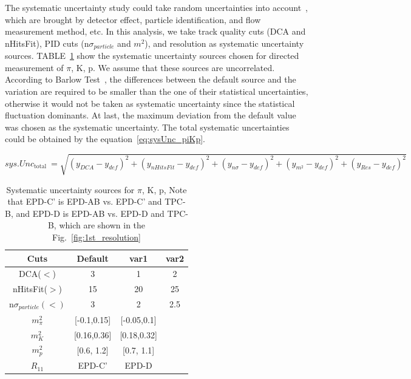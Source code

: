 The systematic uncertainty study could take random uncertainties into account~\cite{barlow2002systematic}, which are brought by detector effect, particle identification, and flow measurement method, etc.
In this analysis, we take track quality cuts (DCA and nHitsFit), PID cuts (n$\sigma_{particle}$ and $m^2$), and resolution as systematic uncertainty sources.
TABLE~\ref{tab:piKp_sysUnc} show the systematic uncertainty sources chosen for directed measurement of $\pi$, K, p.
We assume that these sources are uncorrelated. According to Barlow Test~\cite{barlow2002systematic}, the differences between the default source and the variation are required
to be smaller than the one of their statistical uncertainties, otherwise it would not be taken as systematic uncertainty since the statistical fluctuation dominants.
At last, the maximum deviation from the default value was chosen as the systematic uncertainty. 
The total systematic uncertainties could be obtained by the equation~\ref{eq:sysUnc_piKp}.

\begin{equation}
s y s. Unc_{\text {total }}=\sqrt{\left(y_{DCA}-y_{d e f}\right)^2+\left(y_{n H i tsFit}-y_{d e f}\right)^2+\left(y_{n \sigma}-y_{d e f}\right)^2+\left(y_{m^2}-y_{d e f}\right)^2+\left(y_{Res}-y_{d e f}\right)^2}
\label{eq:sysUnc_piKp}
\end{equation}

\begin{table}
    \centering
    \begin{tabular}{|c|c|c|c|} \hline  
         Cuts&  Default&  var1& var2\\ \hline  
         DCA($<$)&  3&  1& 2\\ \hline  
         nHitsFit($>$)&  15&  20& 25\\ \hline  
         n$\sigma_{particle} (<)$&  3&  2& 2.5\\ \hline  
         $m^2_\pi$&  [-0.1,0.15]&  [-0.05,0.1]
& \\ \hline 
 $m^2_K$& [0.16,0.36]
& [0.18,0.32]
&\\ \hline 
 $m^2_p$& [0.6, 1.2]& [0.7, 1.1]&\\ \hline 
         $R_{11}$&  EPD-C'&  EPD-D& \\ \hline 
    \end{tabular}
    \caption{Systematic uncertainty sources for $\pi$, K, p, Note that EPD-C' is EPD-AB vs. EPD-C' and TPC-B, and EPD-D is EPD-AB vs. EPD-D and TPC-B,
    which are shown in the Fig.~\ref{fig:1st_resolution}}
    \label{tab:piKp_sysUnc}
\end{table}

